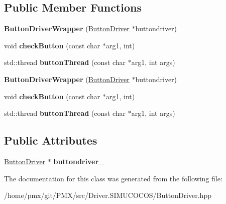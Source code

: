 \subsection*{Public Member Functions}
\begin{DoxyCompactItemize}
\item 
\mbox{\label{classButtonDriverWrapper_aa22e07d6b1010a2439de02d3a7f976aa}} 
{\bfseries Button\+Driver\+Wrapper} (\hyperlink{classButtonDriver}{Button\+Driver} $\ast$buttondriver)
\item 
\mbox{\label{classButtonDriverWrapper_a76a81c5192ed24d5ad99e8c4ffad81b5}} 
void {\bfseries check\+Button} (const char $\ast$arg1, int)
\item 
\mbox{\label{classButtonDriverWrapper_a86cd30a961616fb443fccfd1acaba0f7}} 
std\+::thread {\bfseries button\+Thread} (const char $\ast$arg1, int args)
\item 
\mbox{\label{classButtonDriverWrapper_aa22e07d6b1010a2439de02d3a7f976aa}} 
{\bfseries Button\+Driver\+Wrapper} (\hyperlink{classButtonDriver}{Button\+Driver} $\ast$buttondriver)
\item 
\mbox{\label{classButtonDriverWrapper_a76a81c5192ed24d5ad99e8c4ffad81b5}} 
void {\bfseries check\+Button} (const char $\ast$arg1, int)
\item 
\mbox{\label{classButtonDriverWrapper_a86cd30a961616fb443fccfd1acaba0f7}} 
std\+::thread {\bfseries button\+Thread} (const char $\ast$arg1, int args)
\end{DoxyCompactItemize}
\subsection*{Public Attributes}
\begin{DoxyCompactItemize}
\item 
\mbox{\label{classButtonDriverWrapper_acd78da6d7847ef5764da7082576f65da}} 
\hyperlink{classButtonDriver}{Button\+Driver} $\ast$ {\bfseries buttondriver\+\_\+}
\end{DoxyCompactItemize}


The documentation for this class was generated from the following file\+:\begin{DoxyCompactItemize}
\item 
/home/pmx/git/\+P\+M\+X/src/\+Driver.\+S\+I\+M\+U\+C\+O\+C\+O\+S/Button\+Driver.\+hpp\end{DoxyCompactItemize}
